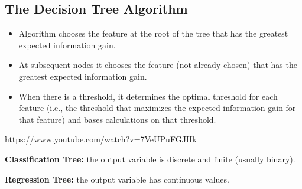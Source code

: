 \subsection{The Decision Tree Algorithm}
\begin{itemize}
    \item Algorithm chooses the feature at the root of the tree that has the greatest expected information gain.
    \item At subsequent nodes it chooses the feature (not already chosen) that has the greatest expected information gain.
    \item When there is a threshold, it determines the optimal threshold for each feature (i.e., the threshold that maximizes the expected information gain for that feature) and bases calculations on that threshold.
\end{itemize}

https://www.youtube.com/watch?v=7VeUPuFGJHk

\textbf{Classification Tree:} the output variable is discrete and finite (usually binary).

\textbf{Regression Tree:} the output variable has continuous values.
